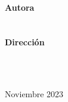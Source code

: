 \begin{titlepage}
\begin{minipage}{\textwidth}
\noindent\begin{minipage}{\textwidth}
    \centering
    \Large\textbf{\tipotrabajo}\\
    \vspace*{1.5cm}
    \textbf{Autora}\\ {\miNombre}\\ {\miTitulacion}\\[2.5ex]
    \textbf{Dirección}\\  {\miTutor}\\ {\TitulacionTutor}
\end{minipage}
\\[2cm]

\vspace*{\fill}

Noviembre 2023
\end{minipage}

\end{titlepage}

\restoregeometry
